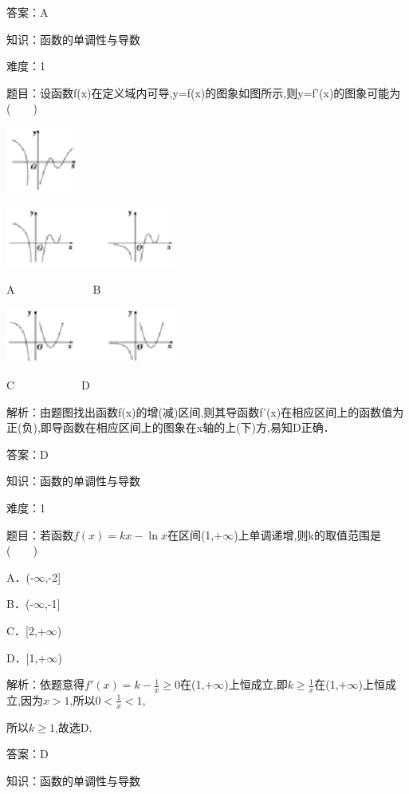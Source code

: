 \documentclass{article} %
\begin{document}
答案：A



知识：函数的单调性与导数

难度：1

题目：设函数f(x)在定义域内可导,y=f(x)的图象如图所示,则y=f'(x)的图象可能为(　　)

\includegraphics*[width=0.95in, height=0.85in, keepaspectratio=false]{image50}

\includegraphics*[width=2.21in, height=0.77in, keepaspectratio=false]{image51}

A　　　　　　　B

\includegraphics*[width=2.21in, height=0.71in, keepaspectratio=false]{image52}

C　　　　　　D

解析：由题图找出函数f(x)的增(减)区间,则其导函数f'(x)在相应区间上的函数值为正(负),即导函数在相应区间上的图象在x轴的上(下)方,易知D正确．

答案：D

知识：函数的单调性与导数

难度：1

题目：若函数$f(x)=kx-\ln x$在区间(1,$+\infty$)上单调递增,则k的取值范围是(　　)

A．(-$\infty$,-2]   

B．(-$\infty$,-1]

C．[2,$+\infty$)   

D．[1,$+\infty$)

解析：依题意得$f'(x)=k-\frac{1}{x}\ge0$在(1,$+\infty$)上恒成立,即$k\ge\frac{1}{x}$在(1,$+\infty$)上恒成立,因为$x>1$,所以$0<\frac{1}{x}<1$,

所以$k\ge1$,故选D.

答案：D



知识：函数的单调性与导数
\end{document}
